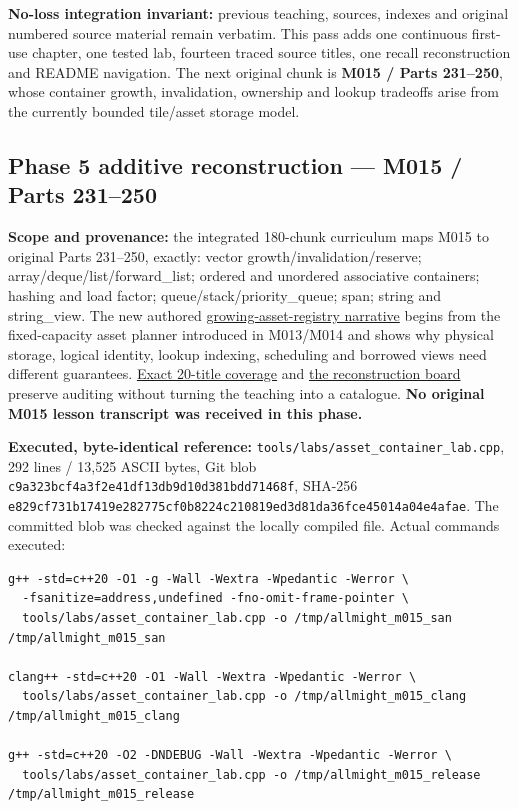 \textbf{No-loss integration invariant:} previous teaching, sources, indexes and original numbered source material remain verbatim. This pass adds one continuous first-use chapter, one tested lab, fourteen traced source titles, one recall reconstruction and README navigation. The next original chunk is \textbf{M015 / Parts 231--250}, whose container growth, invalidation, ownership and lookup tradeoffs arise from the currently bounded tile/asset storage model.

\subsection{Phase 5 additive reconstruction --- M015 / Parts 231--250}\label{appendix-a103e7846d21-phase-5-additive-reconstruction-m015-parts-231250}

\textbf{Scope and provenance:} the integrated 180-chunk curriculum maps M015 to original Parts 231--250, exactly: vector growth/invalidation/reserve; array/deque/list/forward\_list; ordered and unordered associative containers; hashing and load factor; queue/stack/priority\_queue; span; string and string\_view. The new authored \hyperref[01-foundations-i-ch006-an-asset-registry-grows-while-its-handles-must-not-change]{growing-asset-registry narrative} begins from the fixed-capacity asset planner introduced in M013/M014 and shows why physical storage, logical identity, lookup indexing, scheduling and borrowed views need different guarantees. \hyperref[appendix-fd090d982a15-m015-parts-231250-growing-the-asset-registry-without-losing-identities]{Exact 20-title coverage} and \hyperref[appendix-960160274237-a-growing-asset-store-must-preserve-its-promises-m015-retrieval]{the reconstruction board} preserve auditing without turning the teaching into a catalogue. \textbf{No original M015 lesson transcript was received in this phase.}

\textbf{Executed, byte-identical reference:} \texttt{tools/labs/asset\_container\_lab.cpp}, 292 lines / 13,525 ASCII bytes, Git blob \texttt{c9a323bcf4a3f2e41df13db9d10d381bdd71468f}, SHA-256 \texttt{e829cf731b17419e282775cf0b8224c210819ed3d81da36fce45014a04e4afae}. The committed blob was checked against the locally compiled file. Actual commands executed:

\begin{verbatim}
g++ -std=c++20 -O1 -g -Wall -Wextra -Wpedantic -Werror \
  -fsanitize=address,undefined -fno-omit-frame-pointer \
  tools/labs/asset_container_lab.cpp -o /tmp/allmight_m015_san
/tmp/allmight_m015_san

clang++ -std=c++20 -O1 -Wall -Wextra -Wpedantic -Werror \
  tools/labs/asset_container_lab.cpp -o /tmp/allmight_m015_clang
/tmp/allmight_m015_clang

g++ -std=c++20 -O2 -DNDEBUG -Wall -Wextra -Wpedantic -Werror \
  tools/labs/asset_container_lab.cpp -o /tmp/allmight_m015_release
/tmp/allmight_m015_release
\end{verbatim}


